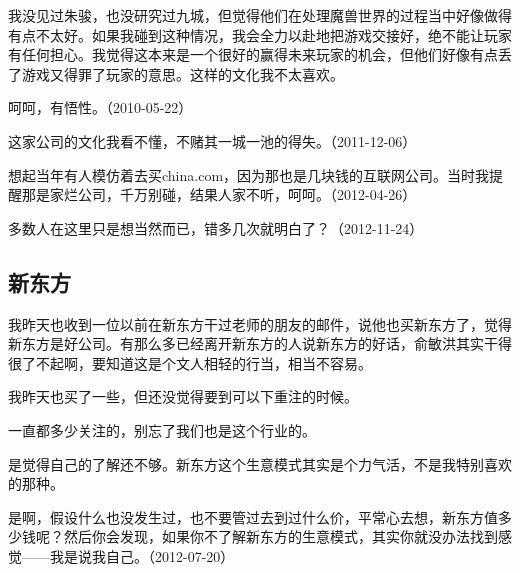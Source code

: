 
我没见过朱骏，也没研究过九城，但觉得他们在处理魔兽世界的过程当中好像做得有点不太好。如果我碰到这种情况，我会全力以赴地把游戏交接好，绝不能让玩家有任何担心。我觉得这本来是一个很好的赢得未来玩家的机会，但他们好像有点丢了游戏又得罪了玩家的意思。这样的文化我不太喜欢。


呵呵，有悟性。（2010-05-22）

这家公司的文化我看不懂，不赌其一城一池的得失。（2011-12-06）


想起当年有人模仿着去买china.com，因为那也是几块钱的互联网公司。当时我提醒那是家烂公司，千万别碰，结果人家不听，呵呵。（2012-04-26）


多数人在这里只是想当然而已，错多几次就明白了？（2012-11-24）

\subsection{新东方}


我昨天也收到一位以前在新东方干过老师的朋友的邮件，说他也买新东方了，觉得新东方是好公司。有那么多已经离开新东方的人说新东方的好话，俞敏洪其实干得很了不起啊，要知道这是个文人相轻的行当，相当不容易。

我昨天也买了一些，但还没觉得要到可以下重注的时候。


一直都多少关注的，别忘了我们也是这个行业的。


是觉得自己的了解还不够。新东方这个生意模式其实是个力气活，不是我特别喜欢的那种。


是啊，假设什么也没发生过，也不要管过去到过什么价，平常心去想，新东方值多少钱呢？然后你会发现，如果你不了解新东方的生意模式，其实你就没办法找到感觉——我是说我自己。（2012-07-20）

